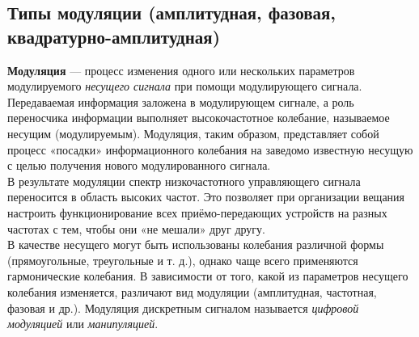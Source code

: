 \subsection{Типы модуляции (амплитудная, фазовая, квадратурно-амплитудная)}
{\bf Модуляция}  — процесс изменения одного или нескольких параметров модулируемого {\it несущего сигнала} при помощи модулирующего сигнала. \\\indent
Передаваемая информация заложена в модулирующем сигнале, а роль переносчика информации выполняет высокочастотное колебание, называемое несущим (модулируемым). Модуляция, таким образом, представляет собой процесс «посадки» информационного колебания на заведомо известную несущую с целью получения нового модулированного сигнала. \\
В результате модуляции спектр низкочастотного управляющего сигнала переносится в область высоких частот. Это позволяет при организации вещания настроить функционирование всех приёмо-передающих устройств на разных частотах с тем, чтобы они «не мешали» друг другу. \\\indent
В качестве несущего могут быть использованы колебания различной формы (прямоугольные, треугольные и т. д.), однако чаще всего применяются гармонические колебания. В зависимости от того, какой из параметров несущего колебания изменяется, различают вид модуляции (амплитудная, частотная, фазовая и др.). Модуляция дискретным сигналом называется {\it цифровой модуляцией} или {\it манипуляцией}. %
